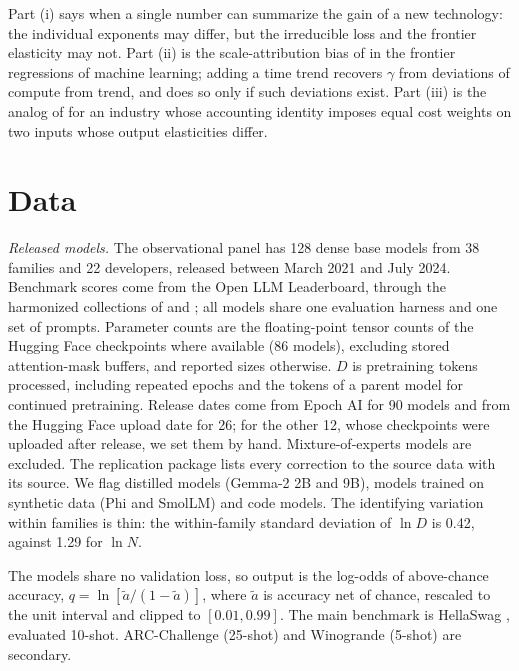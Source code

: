 \documentclass[AER,finalmode]{AEA}
\theoremstyle{definition}
\theoremstyle{remark}
\begin{document}
Part (i) says when a single number can summarize the gain of a new technology: the individual exponents may differ,
but the irreducible loss and the frontier elasticity may not. Part (ii) is the scale-attribution bias of
\citet{nagy2013statistical} in the frontier regressions of machine learning; adding a time trend recovers $\gamma$ from
deviations of compute from trend, and does so only if such deviations exist. Part (iii) is the analog of
\citet{hall1988relation} for an industry whose accounting identity imposes equal cost weights on two inputs whose
output elasticities differ.

\section{Data}\label{sec:data}

\textit{Released models.} The observational panel has 128 dense base models from 38 families and 22 developers,
released between March 2021 and July 2024. Benchmark scores come from the Open LLM Leaderboard, through the
harmonized collections of \citet{ruan2024observational} and \citet{maiapolo2024sloth}; all models share one evaluation
harness and one set of prompts. Parameter counts are the floating-point tensor counts of the Hugging Face checkpoints
where available (86 models), excluding stored attention-mask buffers, and reported sizes otherwise. $D$ is pretraining
tokens processed, including repeated epochs and the tokens of a parent model for continued pretraining. Release dates
come from Epoch AI \citep{epochai2026data} for 90 models and from the Hugging Face upload date for 26; for the other 12,
whose checkpoints were uploaded after release, we set them by hand.
Mixture-of-experts models are excluded. The replication package lists every correction to the source data with its
source. We flag distilled models (Gemma-2 2B and 9B), models trained on synthetic data (Phi and SmolLM) and code
models. The identifying variation within families is thin: the within-family standard deviation of $\ln D$ is 0.42,
against 1.29 for $\ln N$.

The models share no validation loss, so output is the log-odds of above-chance accuracy,
$q=\ln[\tilde a/(1-\tilde a)]$, where $\tilde a$ is accuracy net of chance, rescaled to the unit interval and clipped
to $[0.01,0.99]$. The main benchmark is HellaSwag \citep{zellers2019hellaswag}, evaluated 10-shot. ARC-Challenge
(25-shot) and Winogrande (5-shot) are secondary.
\end{document}
